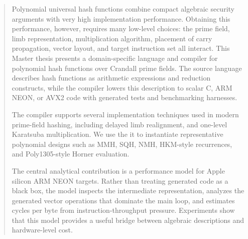 \begin{abstract}
Polynomial universal hash functions combine compact algebraic security arguments with very high implementation performance. Obtaining this performance, however, requires many low-level choices: the prime field, limb representation, multiplication algorithm, placement of carry propagation, vector layout, and target instruction set all interact. This Master thesis presents a domain-specific language and compiler for polynomial hash functions over Crandall prime fields. The source language describes hash functions as arithmetic expressions and reduction constructs, while the compiler lowers this description to scalar C, ARM NEON, or AVX2 code with generated tests and benchmarking harnesses.

The compiler supports several implementation techniques used in modern prime-field hashing, including delayed limb realignment, and one-level Karatsuba multiplication. We use the it to instantiate representative polynomial designs such as MMH, SQH, NMH, HKM-style recurrences, and Poly1305-style Horner evaluation.

The central analytical contribution is a performance model for Apple silicon ARM NEON targets. Rather than treating generated code as a black box, the model inspects the intermediate representation, analyzes the generated vector operations that dominate the main loop, and estimates cycles per byte from instruction-throughput pressure. Experiments show that this model provides a useful bridge between algebraic descriptions and hardware-level cost.
\end{abstract}
